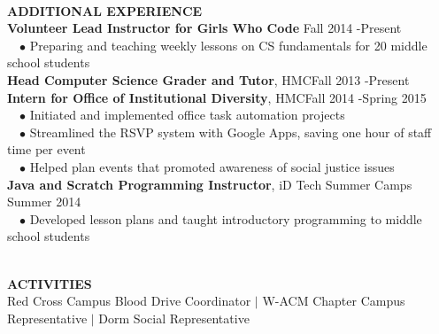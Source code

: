 \documentclass[11.5pt]{article}
\newcommand{\wrapTitle}[1]{{\sectionNL \textbf{\Large #1}} \sectionNL}
\newcommand{\vb}{ $\mid$ }
\newcommand{\sectionNL}{~\\[1pt]}
\newcommand{\customtab}{$\hspace{10pt} \bullet \hspace{2pt}$}
\newcommand{\customtabinline}{$\hspace{23pt}$}
\newcommand{\HMC}{HMC}
\newcommand{\rightAlign}{\hfill}
\begin{document}
\begin{flushleft}
\wrapTitle{ADDITIONAL EXPERIENCE}
\textbf{Volunteer Lead Instructor for Girls Who Code} \rightAlign Fall 2014 -Present \\ 
\customtab Preparing and teaching weekly lessons on CS fundamentals for 20 middle school students\\
\textbf{Head Computer Science Grader and Tutor}, \HMC \rightAlign Fall 2013 -Present \\ 
\textbf{Intern for Office of Institutional Diversity}, \HMC \rightAlign Fall 2014 -Spring 2015 \\
\customtab Initiated and implemented office task automation projects\\
\customtab Streamlined the RSVP system with Google Apps, saving one hour of staff time per event  \\
\customtab Helped plan events that promoted awareness of social justice issues \\
\textbf{Java and Scratch Programming Instructor}, iD Tech Summer Camps \rightAlign Summer 2014 \\
\customtab Developed lesson plans and taught introductory programming to  middle school students\\




\end{flushleft}


\begin{flushleft}
\wrapTitle{ACTIVITIES}
\normalsize
 Red Cross Campus Blood Drive  Coordinator
 \vb W-ACM Chapter Campus Representative
 \vb Dorm Social Representative
\end{flushleft}


	
\end{document}
